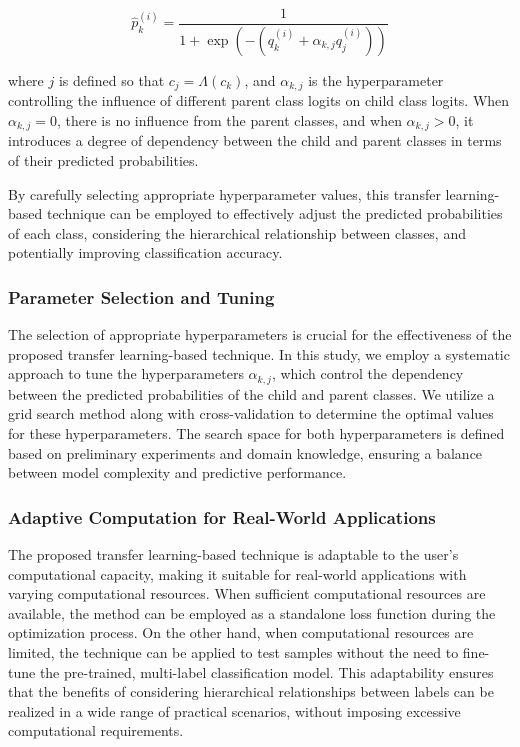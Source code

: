 \documentclass[preprint,3p,times, review]{elsarticle}
\begin{document}
\begin{equation}
    \widehat{p}_k^{(i)} = \frac{1}{ 1 + \exp \left(-\left(q_k^{(i)} + \alpha_{k,j} q_j^{(i)} \right)\right) }
    \label{Taxonomy.Eq.Taxonomy.Eq.1.pred.approach1}
\end{equation}

where $j $ is defined so that $c_j=\Lambda(c_k) $, and $\alpha_{k,j} $ is the hyperparameter controlling the influence of different parent class logits on child class logits. When $\alpha_{k,j}=0 $, there is no influence from the parent classes, and when $\alpha_{k,j}>0 $, it introduces a degree of dependency between the child and parent classes in terms of their predicted probabilities.

By carefully selecting appropriate hyperparameter values, this transfer learning-based technique can be employed to effectively adjust the predicted probabilities of each class, considering the hierarchical relationship between classes, and potentially improving classification accuracy.

\subsubsection{Parameter Selection and Tuning}

The selection of appropriate hyperparameters is crucial for the effectiveness of the proposed transfer learning-based technique. In this study, we employ a systematic approach to tune the hyperparameters $\alpha_{k,j} $, which control the dependency between the predicted probabilities of the child and parent classes. We utilize a grid search method along with cross-validation to determine the optimal values for these hyperparameters. The search space for both hyperparameters is defined based on preliminary experiments and domain knowledge, ensuring a balance between model complexity and predictive performance.

\subsubsection{Adaptive Computation for Real-World Applications}

The proposed transfer learning-based technique is adaptable to the user's computational capacity, making it suitable for real-world applications with varying computational resources. When sufficient computational resources are available, the method can be employed as a standalone loss function during the optimization process. On the other hand, when computational resources are limited, the technique can be applied to test samples without the need to fine-tune the pre-trained, multi-label classification model. This adaptability ensures that the benefits of considering hierarchical relationships between labels can be realized in a wide range of practical scenarios, without imposing excessive computational requirements.
\end{document}
